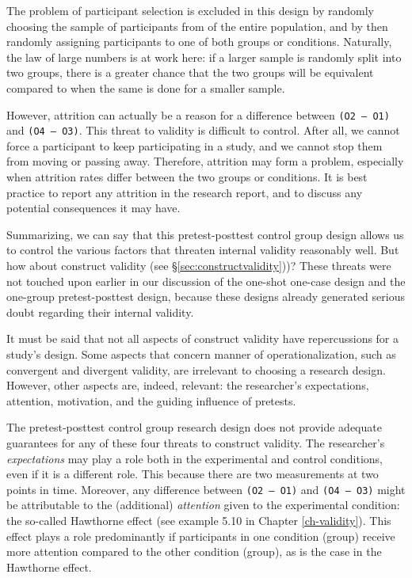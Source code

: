\documentclass[
]{book}
\begin{document}
The problem of participant selection is excluded in this design by randomly choosing the sample of participants from of the entire population, and by then randomly assigning participants to one of both groups or conditions. Naturally, the law of large numbers is at work here: if a larger sample is randomly split into two groups, there is a greater chance that the two groups will be equivalent compared to when the same is done for a smaller sample.

However, attrition can actually be a reason for a difference between \texttt{(O2\ –\ O1)} and \texttt{(O4\ –\ O3)}. This threat to validity is difficult to control. After all, we cannot force a participant to keep participating in a study, and we cannot stop them from moving or passing away. Therefore, attrition may form a problem, especially when attrition rates differ between the two groups or conditions. It is best practice to report any attrition in the research report, and to discuss any potential consequences it may have.

Summarizing, we can say that this pretest-posttest control group design allows us to control the various factors that threaten internal validity reasonably well. But how about construct validity (see §\ref{sec:constructvalidity}))? These threats were not touched upon earlier in our discussion of the one-shot one-case design and the one-group pretest-posttest design, because these designs already generated serious doubt regarding their internal validity.

It must be said that not all aspects of construct validity have repercussions for a study's design. Some aspects that concern manner of operationalization, such as convergent and divergent validity, are irrelevant to choosing a research design. However, other aspects are, indeed, relevant: the researcher's expectations, attention, motivation, and the guiding influence of pretests.

The pretest-posttest control group research design does not provide adequate guarantees for any of these four threats to construct validity. The researcher's \emph{expectations} may play a role both in the experimental and control conditions, even if it is a different role. This because there are two measurements at two points in time. Moreover, any difference between \texttt{(O2\ –\ O1)} and \texttt{(O4\ –\ O3)} might be attributable to the (additional) \emph{attention} given to the experimental condition: the so-called Hawthorne effect (see example 5.10 in Chapter \ref{ch-validity}). This effect plays a role predominantly if participants in one condition (group) receive more attention compared to the other condition (group), as is the case in the Hawthorne effect.
\end{document}
